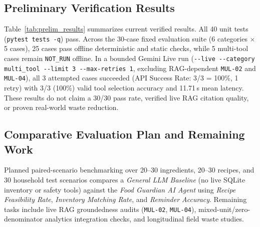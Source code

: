 \subsection{Preliminary Verification Results}

Table~\ref{tab:prelim_results} summarizes current verified results. All 40 unit tests (\texttt{pytest tests -q}) pass. Across the 30-case fixed evaluation suite (6 categories $\times$ 5 cases), 25 cases pass offline deterministic and static checks, while 5 multi-tool cases remain \texttt{NOT\_RUN} offline. In a bounded Gemini Live run (\texttt{{-}{-}live {-}{-}category multi\_tool {-}{-}limit 3 {-}{-}max-retries 1}, excluding RAG-dependent \texttt{MUL-02} and \texttt{MUL-04}), all 3 attempted cases succeeded (API Success Rate: 3/3 = 100\%, 1 retry) with 3/3 (100\%) valid tool selection accuracy and 11.71\,s mean latency. These results do not claim a 30/30 pass rate, verified live RAG citation quality, or proven real-world waste reduction.

\begin{table}[t]
\centering
\caption{Preliminary Verification and Evaluation Summary (Prototype Scope)}
\label{tab:prelim_results}
\renewcommand{\arraystretch}{1.2}
\end{table}

\subsection{Comparative Evaluation Plan and Remaining Work}

Planned paired-scenario benchmarking over 20--30 ingredients, 20--30 recipes, and 30 household test scenarios compares a \textit{General LLM Baseline} (no live SQLite inventory or safety tools) against the \textit{Food Guardian AI Agent} using \textit{Recipe Feasibility Rate}, \textit{Inventory Matching Rate}, and \textit{Reminder Accuracy}. Remaining tasks include live RAG groundedness audits (\texttt{MUL-02}, \texttt{MUL-04}), mixed-unit/zero-denominator analytics integration checks, and longitudinal field waste studies.
